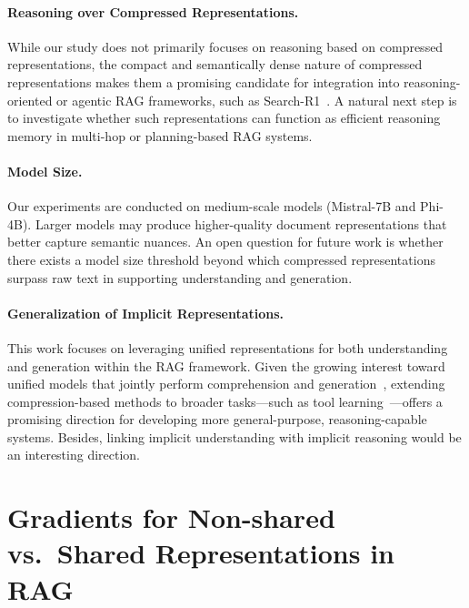 \documentclass{applemlr}
\numberwithin{equation}{section}
\begin{document}
\paragraph{Reasoning over Compressed Representations.}
While our study does not primarily focuses on reasoning based on compressed representations, the compact and semantically dense nature of compressed representations makes them a promising candidate for integration into reasoning-oriented or agentic RAG frameworks, 
such as Search-R1~\citep{jin2025searchr}. 
A natural next step is to investigate whether such representations can function as efficient reasoning memory in multi-hop or planning-based RAG systems.

\paragraph{Model Size.}
Our experiments are conducted on medium-scale models (Mistral-7B and Phi-4B). Larger models may produce higher-quality document representations that better capture semantic nuances.
An open question for future work is whether there exists a model size threshold beyond which compressed representations surpass raw text in supporting understanding and generation.

\paragraph{Generalization of Implicit Representations.}
This work focuses on leveraging unified representations for both understanding and generation within the RAG framework. 
Given the growing interest toward unified models that jointly perform comprehension and generation~\citep{zhang2025unifiedmultimodalunderstandinggeneration}, 
extending compression-based methods to broader tasks—such as tool learning~\citep{10.1007/s11704-024-40678-2}—offers a promising direction for developing more general-purpose, reasoning-capable systems. Besides, linking implicit understanding with implicit reasoning \citep{hao2025training,kang2025ladirlatentdiffusionenhances} would be an interesting direction.







\appendix

\section{Gradients for Non-shared vs.\ Shared Representations in RAG}
\label{app_theo}
\end{document}
